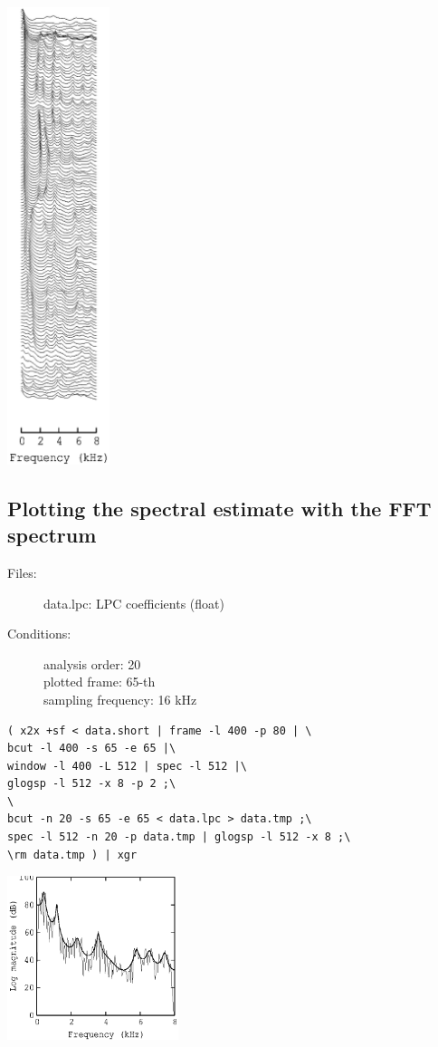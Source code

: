\documentclass[a4paper,10pt]{article}
\begin{document}
\includegraphics[width=3cm]{data.lpc.grlogsp.eps}

\subsection{Plotting the spectral estimate with the FFT spectrum}

\begin{description}
\item[Files:]
  data.lpc: LPC coefficients (float)
\item[Conditions:]
  analysis order: 20\\
  plotted frame: 65-th\\
  sampling frequency: 16 kHz
\end{description}

\begin{verbatim}
( x2x +sf < data.short | frame -l 400 -p 80 | \
bcut -l 400 -s 65 -e 65 |\
window -l 400 -L 512 | spec -l 512 |\
glogsp -l 512 -x 8 -p 2 ;\
\
bcut -n 20 -s 65 -e 65 < data.lpc > data.tmp ;\
spec -l 512 -n 20 -p data.tmp | glogsp -l 512 -x 8 ;\
\rm data.tmp ) | xgr
\end{verbatim}

\includegraphics[width=5cm]{data.lpc.glogsp.eps}
\end{document}
